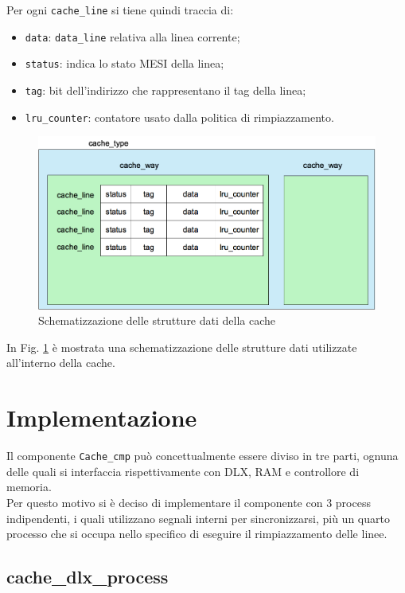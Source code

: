 Per ogni \texttt{cache\_line} si tiene quindi traccia di:
\begin{itemize}
  \item \texttt{data}: \texttt{data\_line} relativa alla linea corrente;
  \item \texttt{status}: indica lo stato MESI della linea;
  \item \texttt{tag}: bit dell'indirizzo che rappresentano il tag della linea;
  \item \texttt{lru\_counter}: contatore usato dalla politica di rimpiazzamento.
\end{itemize}


\begin{figure}[h!]
\centering
\includegraphics[width=\textwidth]{img/cacheType.png}
\caption{Schematizzazione delle strutture dati della cache}
\label{fig:c_type}
\end{figure}

In Fig. \ref{fig:c_type} \`e mostrata una schematizzazione delle strutture dati utilizzate all'interno della cache.

\section{Implementazione}

Il componente \texttt{Cache\_cmp} pu\`o concettualmente essere diviso in tre parti, ognuna delle quali si interfaccia rispettivamente con DLX, RAM e controllore di memoria.\\
Per questo motivo si \`e deciso di implementare il componente con 3 process indipendenti, i quali utilizzano segnali interni per sincronizzarsi, pi\`u un quarto processo che si occupa nello specifico di eseguire il rimpiazzamento delle linee.\\

\subsection{cache\_dlx\_process}


